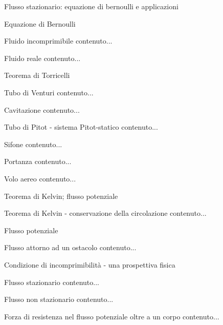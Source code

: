 \documentclass[a4paper,11pt]{report}
\begin{document}
	\begin{chapter}{Flusso stazionario: equazione di bernoulli e applicazioni}
		\begin{section}{Equazione di Bernoulli}
			\begin{subsection}{Fluido incomprimibile}
				contenuto...
			\end{subsection}
			\begin{subsection}{Fluido reale}
				contenuto...
			\end{subsection}
		\end{section}
		\begin{section}{Teorema di Torricelli}
			\begin{subsection}{Tubo di Venturi}
				contenuto...
			\end{subsection}
			\begin{subsection}{Cavitazione}
				contenuto...
			\end{subsection}
			\begin{subsection}{Tubo di Pitot - sistema Pitot-statico}
				contenuto...
			\end{subsection}
			\begin{subsection}{Sifone}
				contenuto...
			\end{subsection}
			\begin{subsection}{Portanza}
				contenuto...
			\end{subsection}
			\begin{subsection}{Volo aereo}
				contenuto...
			\end{subsection}
		\end{section}
	\end{chapter}

	\begin{chapter}{Teorema di Kelvin; flusso potenziale}
		\begin{section}{Teorema di Kelvin - conservazione della circolazione}
			contenuto...
		\end{section}
		\begin{section}{Flusso potenziale}
			\begin{subsection}{Flusso attorno ad un ostacolo}
				contenuto...
			\end{subsection}
		\end{section}
		\begin{section}{Condizione di incomprimibilità - una prospettiva fisica}
			\begin{subsection}{Flusso stazionario}
				contenuto...
			\end{subsection}
	 		\begin{subsection}{Flusso non stazionario}
	 			contenuto...
	 		\end{subsection}
		\end{section}
		\begin{section}{Forza di resistenza nel flusso potenziale oltre a un corpo}
			contenuto...
		\end{section}
	\end{chapter}
\end{document}
